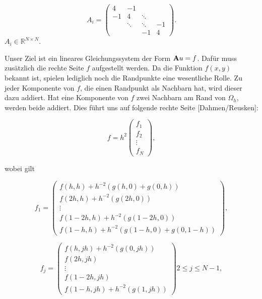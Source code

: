 \begin{equation}
A_{i} = 
\begin{pmatrix}
4 & -1 & & \\
-1 & 4 & \ddots & \\
 & \ddots & \ddots & -1 \\
 & & -1 & 4
\end{pmatrix}.
\end{equation}
$A_{i} \in \mathbb{R}^{N \times N}$.

Unser Ziel ist ein lineares Gleichungssystem der Form ${\textbf{A}}u = f$. Dafür muss zusätzlich die rechte Seite $f$ aufgestellt werden. Da die Funktion $f(x,y)$ bekannt ist, spielen lediglich noch die Randpunkte eine wesentliche Rolle. Zu jeder Komponente von $f$, die einen Randpunkt als Nachbarn hat, wird dieser dazu addiert. Hat eine Komponente von $f$ zwei Nachbarn am Rand von $\Omega_{h}$, werden beide addiert. Dies führt uns auf folgende rechte Seite [Dahmen/Reusken]:

\begin{equation}
f = h^{2}
\begin{pmatrix}
f_{1} \\ f_{2} \\ \vdots \\ f_{N}
\end{pmatrix},
\end{equation}

wobei gilt

\begin{equation}
f_{1} = 
\begin{pmatrix}
f(h,h) + h^{-2}(g(h,0)+g(0,h)) \\
f(2h,h) + h^{-2}(g(2h,0)) \\
\vdots \\
f(1-2h,h) + h^{-2}(g(1-2h,0)) \\
f(1-h,h) + h^{-2}(g(1-h,0)+g(0,1-h))
\end{pmatrix},
\end{equation}

\begin{equation}
f_{j} = 
\begin{pmatrix}
f(h,jh) + h^{-2}(g(0,jh)) \\
f(2h,jh) \\
\vdots \\
f(1-2h,jh) \\
f(1-h,jh) + h^{-2}(g(1,jh))
\end{pmatrix}
2 \le j \le N-1,
\end{equation}

